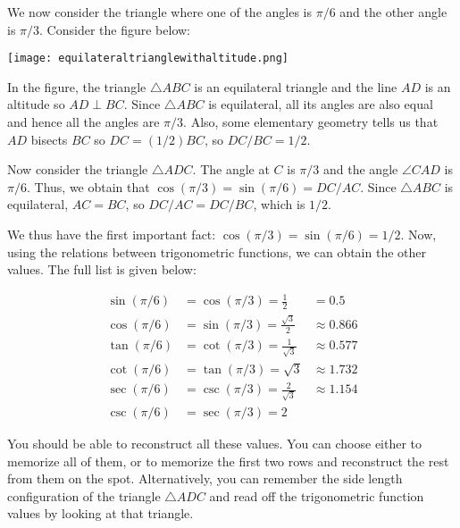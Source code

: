 \documentclass{amsart}
\begin{document}
We now consider the triangle where one of the angles is $\pi/6$
and the other angle is $\pi/3$. Consider the figure below:

\texttt{[image: equilateraltrianglewithaltitude.png]}

In the figure, the triangle $\triangle ABC$ is an equilateral triangle
and the line $AD$ is an altitude so $AD \perp BC$. Since $\triangle
ABC$ is equilateral, all its angles are also equal and hence all the
angles are $\pi/3$. Also, some elementary geometry tells us that
$AD$ bisects $BC$ so $DC = (1/2)BC$, so $DC/BC = 1/2$.

Now consider the triangle $\triangle ADC$. The angle at $C$ is
$\pi/3$ and the angle $\angle CAD$ is $\pi/6$. Thus, we
obtain that $\cos (\pi/3) = \sin (\pi/6) = DC/AC$. Since
$\triangle ABC$ is equilateral, $AC = BC$, so $DC/AC = DC/BC$, which
is $1/2$.

We thus have the first important fact: $\cos (\pi/3) = \sin
(\pi/6) = 1/2$. Now, using the relations between trigonometric
functions, we can obtain the other values. The full list is given
below:

\begin{align*}
  \sin (\pi/6) & = \cos (\pi/3)  = \frac{1}{2}& = 0.5\\
  \cos (\pi/6) & = \sin (\pi/3) = \frac{\sqrt{3}}{2} & \approx 0.866 \\
  \tan (\pi/6) & = \cot (\pi/3) = \frac{1}{\sqrt{3}} & \approx 0.577 \\
  \cot (\pi/6) & = \tan (\pi/3) = \sqrt{3} & \approx 1.732\\
  \sec (\pi/6) & = \csc (\pi/3) = \frac{2}{\sqrt{3}} & \approx 1.154\\
  \csc (\pi/6) & = \sec (\pi/3) = 2
\end{align*}

You should be able to reconstruct all these values. You can choose
either to memorize all of them, or to memorize the first two rows and
reconstruct the rest from them on the spot. Alternatively, you can
remember the side length configuration of the triangle $\triangle ADC$
and read off the trigonometric function values by looking at that
triangle.
\end{document}
